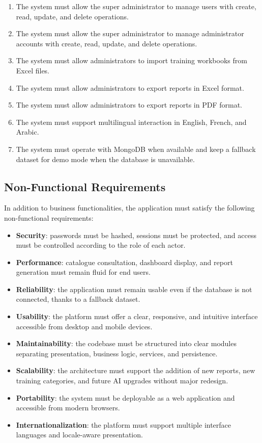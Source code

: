 \begin{enumerate}
\item The system must allow the super administrator to manage users with create, read, update, and delete operations.
\item The system must allow the super administrator to manage administrator accounts with create, read, update, and delete operations.
\item The system must allow administrators to import training workbooks from Excel files.
\item The system must allow administrators to export reports in Excel format.
\item The system must allow administrators to export reports in PDF format.
\item The system must support multilingual interaction in English, French, and Arabic.
\item The system must operate with MongoDB when available and keep a fallback dataset for demo mode when the database is unavailable.
\end{enumerate}

\subsection{Non-Functional Requirements}
In addition to business functionalities, the application must satisfy the following non-functional requirements:

\begin{itemize}
\item \textbf{Security}: passwords must be hashed, sessions must be protected, and access must be controlled according to the role of each actor.
\item \textbf{Performance}: catalogue consultation, dashboard display, and report generation must remain fluid for end users.
\item \textbf{Reliability}: the application must remain usable even if the database is not connected, thanks to a fallback dataset.
\item \textbf{Usability}: the platform must offer a clear, responsive, and intuitive interface accessible from desktop and mobile devices.
\item \textbf{Maintainability}: the codebase must be structured into clear modules separating presentation, business logic, services, and persistence.
\item \textbf{Scalability}: the architecture must support the addition of new reports, new training categories, and future AI upgrades without major redesign.
\item \textbf{Portability}: the system must be deployable as a web application and accessible from modern browsers.
\item \textbf{Internationalization}: the platform must support multiple interface languages and locale-aware presentation.
\end{itemize}

